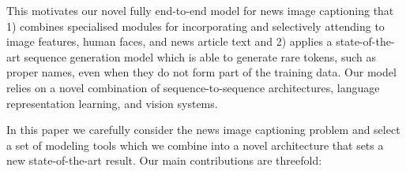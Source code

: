 This motivates our novel fully end-to-end
model for news image captioning that 1) combines specialised modules for
incorporating and selectively attending to image features, human faces, and
news article text and
2) applies a state-of-the-art sequence generation model which is able to
generate rare tokens, such as proper names, even when they do not form part of
the
training data. Our model relies on a novel combination of sequence-to-sequence
architectures, language representation learning, and
vision systems.







In this paper we carefully consider the news image captioning problem and
select a set of modeling tools which we combine into a novel architecture that
sets a new state-of-the-art result. Our main contributions are threefold:


